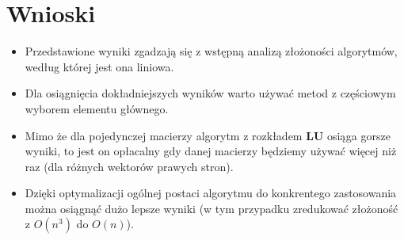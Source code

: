 \documentclass{article}
\newcommand{\mL}{\bm{L}}
\newcommand{\mU}{\bm{U}}
\begin{document}
\section*{Wnioski}
\begin{itemize}
	\item Przedstawione wyniki zgadzają się z wstępną analizą złożoności algorytmów, według której jest ona liniowa.
	\item Dla osiągnięcia dokładniejszych wyników warto używać metod z częściowym wyborem elementu głównego.
	\item Mimo że dla pojedynczej macierzy algorytm z rozkładem $\mL\mU$ osiąga gorsze wyniki, to jest on opłacalny gdy danej macierzy będziemy używać więcej niż raz (dla różnych wektorów prawych stron).
	\item Dzięki optymalizacji ogólnej postaci algorytmu do konkrentego zastosowania można osiągnąć dużo lepsze wyniki (w tym przypadku zredukować złożoność z $O(n^3)$ do $O(n)$).
\end{itemize}
\end{document}
